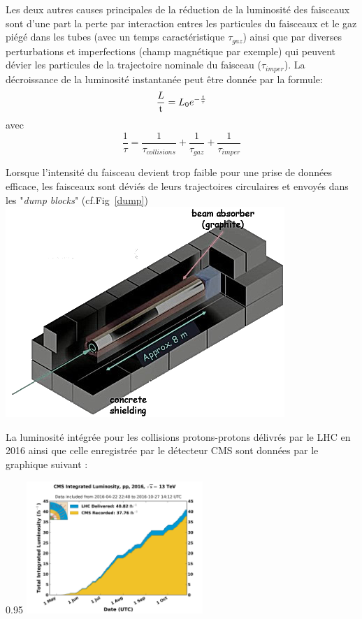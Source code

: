 Les deux autres causes principales de la réduction de la luminosité des faisceaux sont d'une part la perte par interaction entres les particules du faisceaux et le gaz piégé dans les tubes (avec un temps caractéristique $\tau_{gaz}$) ainsi que par diverses perturbations et imperfections (champ magnétique par exemple) qui peuvent dévier les particules de la trajectoire nominale du faisceau ($\tau_{imper}$). 
La décroissance de la luminosité instantanée peut être donnée par la formule:
\begin{equation}
\frac{\mathrm \mathcal{L}}{\mathrm t} = L_{0} e^{-\frac{t}{\tau}}
\end{equation}
avec
\begin{equation}
\frac{1}{\tau} = \frac{1}{\tau_{collisions}}+\frac{1}{\tau_{gaz}}+\frac{1}{\tau_{imper}}
\end{equation}

Lorsque l'intensité du faisceau devient trop faible pour une prise de données efficace, les faisceaux sont déviés de leurs trajectoires circulaires et envoyés dans les "\textit{dump blocks}" (cf.Fig~\ref{dump})
\marginpar
{
	\includegraphics[width=\marginparwidth]{LHC/dump.png}
    	\label{dump}
}

La luminosité intégrée pour les collisions protons-protons délivrés par le LHC en \num{2016} ainsi que celle enregistrée par le détecteur CMS sont données par le graphique suivant :

\begin{minipagewithmarginpars}[ht!]{0.95\textwidth}
\centering
\includegraphics[width=0.50\textwidth]{LHC/luminosity.png}
\end{minipagewithmarginpars}

